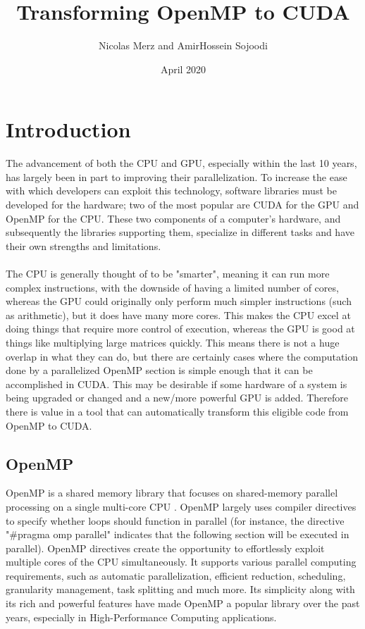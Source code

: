 \documentclass{article}
\title{Transforming OpenMP to CUDA}
\author{Nicolas Merz and AmirHossein Sojoodi}
\date{April 2020}
\begin{document}
\maketitle

\section{Introduction}
The advancement of both the CPU and GPU, especially within the last 10 years, has largely been in part to improving their parallelization. To increase the ease with which developers can exploit this technology, software libraries must be developed for the hardware; two of the most popular are CUDA for the GPU and OpenMP for the CPU. These two components of a computer's hardware, and subsequently the libraries supporting them, specialize in different tasks and have their own strengths and limitations. 

\paragraph{}
The CPU is generally thought of to be "smarter", meaning it can run more complex instructions, with the downside of having a limited number of cores, whereas the GPU could originally only perform much simpler instructions (such as arithmetic), but it does have many more cores. This makes the CPU excel at doing things that require more control of execution, whereas the GPU is good at things like multiplying large matrices quickly. This means there is not a huge overlap in what they can do, but there are certainly cases where the computation done by a parallelized OpenMP section is simple enough that it can be accomplished in CUDA. This may be desirable if some hardware of a system is being upgraded or changed and a new/more powerful GPU is added. Therefore there is value in a tool that can automatically transform this eligible code from OpenMP to CUDA.

\subsection{OpenMP}

OpenMP is a shared memory library that focuses on shared-memory parallel processing on a single multi-core CPU \citep{openmp_2018}. OpenMP largely uses compiler directives to specify whether loops should function in parallel (for instance, the directive "\#pragma omp parallel" indicates that the following section will be executed in parallel). OpenMP directives create the opportunity to effortlessly exploit multiple cores of the CPU simultaneously. It supports various parallel computing requirements, such as automatic parallelization, efficient reduction, scheduling, granularity management, task splitting and much more. Its simplicity along with its rich and powerful features have made OpenMP a popular library over the past years, especially in High-Performance Computing applications.
\end{document}
